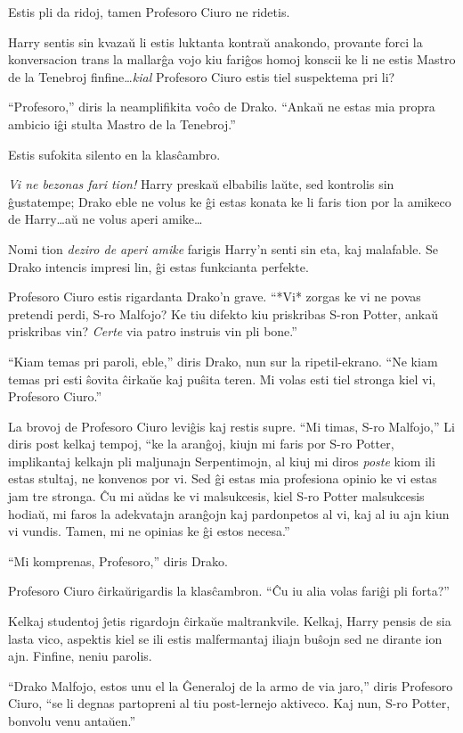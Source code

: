 Estis pli da ridoj, tamen Profesoro Ciuro ne ridetis.

Harry sentis sin kvazaŭ li estis luktanta kontraŭ anakondo, provante
forci la konversacion trans la mallarĝa vojo kiu fariĝos homoj konscii
ke li ne estis Mastro de la Tenebroj finfine\ldots \emph{kial}
Profesoro Ciuro estis tiel suspektema pri li?

``Profesoro,'' diris la neamplifikita voĉo de Drako. ``Ankaŭ ne estas
mia propra ambicio iĝi stulta Mastro de la Tenebroj.''

Estis sufokita silento  en la klasĉambro.

\emph{Vi ne bezonas fari tion!} Harry preskaŭ elbabilis laŭte, sed
kontrolis sin ĝustatempe; Drako eble ne volus ke ĝi estas konata ke li
faris tion por la amikeco de Harry\ldots aŭ ne volus aperi amike\ldots


Nomi tion \emph{deziro de aperi amike} farigis Harry'n senti sin eta,
kaj malafable. Se Drako intencis impresi lin, ĝi estas funkcianta
perfekte.

Profesoro Ciuro estis rigardanta Drako'n grave. ``*Vi* zorgas ke vi ne
povas pretendi perdi, S-ro Malfojo? Ke tiu difekto kiu priskribas
S-ron Potter, ankaŭ priskribas vin? \emph{Certe} via patro instruis
vin pli bone.''

``Kiam temas pri paroli, eble,'' diris Drako, nun sur la
ripetil-ekrano. ``Ne kiam temas pri esti ŝovita ĉirkaŭe kaj puŝita
teren. Mi volas esti tiel stronga kiel vi, Profesoro Ciuro.''

La brovoj de Profesoro Ciuro leviĝis kaj restis supre. ``Mi timas,
S-ro Malfojo,'' Li diris post kelkaj tempoj, ``ke la aranĝoj, kiujn mi
faris por S-ro Potter, implikantaj kelkajn pli maljunajn Serpentimojn,
al kiuj mi diros \emph{poste} kiom ili estas stultaj, ne konvenos por
vi. Sed ĝi estas mia profesiona opinio ke vi estas jam tre stronga. Ĉu
mi aŭdas ke vi malsukcesis, kiel S-ro Potter malsukcesis hodiaŭ, mi
faros la adekvatajn aranĝojn kaj pardonpetos al vi, kaj al iu ajn kiun vi
vundis. Tamen, mi ne opinias ke ĝi estos necesa.''

``Mi komprenas, Profesoro,'' diris Drako.

Profesoro Ciuro ĉirkaŭrigardis la klasĉambron. ``Ĉu iu alia volas
fariĝi pli forta?''

Kelkaj studentoj ĵetis rigardojn ĉirkaŭe maltrankvile. Kelkaj, Harry
pensis de sia lasta vico, aspektis kiel se ili estis malfermantaj
iliajn buŝojn sed ne dirante ion ajn. Finfine, neniu parolis.

``Drako Malfojo, estos unu el la Ĝeneraloj de la armo de via jaro,''
diris Profesoro Ciuro, ``se li degnas partopreni al tiu post-lernejo
aktiveco. Kaj nun, S-ro Potter, bonvolu venu antaŭen.''

